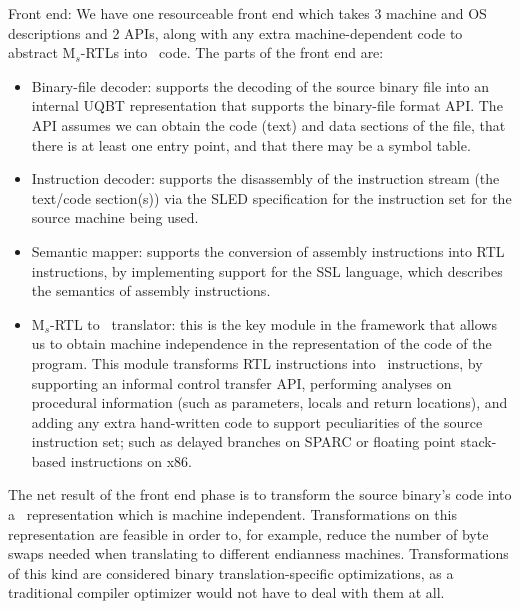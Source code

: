 \begin{description}
\item Front end: 
We have one resourceable front end which takes 3 machine and OS 
descriptions and 2 APIs, along with any extra machine-dependent 
code to abstract M$_s$-RTLs into \hrtl\ code.  The parts of the 
front end are: 

\begin{itemize}
\item Binary-file decoder: supports the decoding of the source 
	binary file into an internal UQBT representation that supports 
	the binary-file format API.  The API assumes we can obtain the 
	code (text) and data sections of the file, that there is at 
	least one entry point, and that there may be a symbol table.  

\item Instruction decoder: supports the disassembly of the instruction 
	stream (the text/code section(s)) via the SLED specification for
	the instruction set for the source machine being used.   

\item Semantic mapper: supports the conversion of assembly instructions 
	into RTL instructions, by implementing support for the SSL language, 
	which describes the semantics of assembly instructions. 

\item M$_s$-RTL to \hrtl\ translator: this is the key module in the
	framework that allows us to obtain machine independence in the 
	representation of the code of the program.  This module transforms 
	RTL instructions into \hrtl\ instructions, by supporting an 
	informal control transfer API, performing analyses on procedural  
	information (such as parameters, locals and return locations), 
	and adding any extra hand-written code to support peculiarities 
	of the source instruction set; such as delayed branches on SPARC 
	or floating point stack-based instructions on x86.    
\end{itemize}

The net result of the front end phase is to transform the source 
binary's code into a \hrtl\ representation which is machine independent. 
Transformations on this representation are feasible in order to, 
for example, reduce the number of byte swaps needed when translating 
to different endianness machines.  Transformations of this kind are 
considered binary translation-specific optimizations, as a traditional 
compiler optimizer would not have to deal with them at all.  


\end{description}
